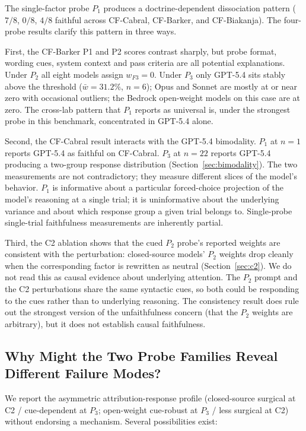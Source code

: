\documentclass[11pt]{article}
\begin{document}
The single-factor probe $P_1$ produces a doctrine-dependent dissociation pattern ($7/8$, $0/8$, $4/8$ faithful across CF-Cabral, CF-Barker, and CF-Biakanja). The four-probe results clarify this pattern in three ways.

First, the CF-Barker P1 and P2 scores contrast sharply, but probe format, wording cues, system context and pass criteria are all potential explanations. Under $P_2$ all eight models assign $w_{F3} = 0$. Under $P_3$ only GPT-5.4 sits stably above the threshold ($\bar{w}=31.2\%$, $n=6$); Opus and Sonnet are mostly at or near zero with occasional outliers; the Bedrock open-weight models on this case are at zero. The cross-lab pattern that $P_1$ reports as universal is, under the strongest probe in this benchmark, concentrated in GPT-5.4 alone.

Second, the CF-Cabral result interacts with the GPT-5.4 bimodality. $P_1$ at $n=1$ reports GPT-5.4 as faithful on CF-Cabral. $P_3$ at $n=22$ reports GPT-5.4 producing a two-group response distribution (Section~\ref{sec:bimodality}). The two measurements are not contradictory; they measure different slices of the model's behavior. $P_1$ is informative about a particular forced-choice projection of the model's reasoning at a single trial; it is uninformative about the underlying variance and about which response group a given trial belongs to. Single-probe single-trial faithfulness measurements are inherently partial.

Third, the C2 ablation shows that the cued $P_2$ probe's reported weights are consistent with the perturbation: closed-source models' $P_2$ weights drop cleanly when the corresponding factor is rewritten as neutral (Section~\ref{sec:c2}). We do not read this as causal evidence about underlying attention. The $P_2$ prompt and the C2 perturbations share the same syntactic cues, so both could be responding to the cues rather than to underlying reasoning. The consistency result does rule out the strongest version of the unfaithfulness concern (that the $P_2$ weights are arbitrary), but it does not establish causal faithfulness.

\subsection{Why Might the Two Probe Families Reveal Different Failure Modes?}

We report the asymmetric attribution-response profile (closed-source surgical at C2 / cue-dependent at $P_3$; open-weight cue-robust at $P_3$ / less surgical at C2) without endorsing a mechanism. Several possibilities exist:
\end{document}
